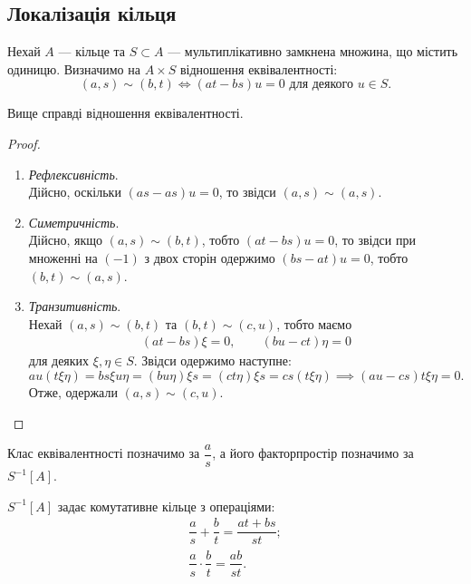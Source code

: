 \documentclass{math_library}
\begin{document}
\subsection{Локалізація кільця}
Нехай $A$ --- кільце та $S \subset A$ --- мультиплікативно замкнена множина, що містить одиницю. Визначимо на $A \times S$ відношення еквівалентності:
\[
(a,s) \sim (b,t) \iff (at - bs)u = 0 \text{ для деякого $u \in S$}.
\]

\begin{proposition}
Вище справді відношення еквівалентності.
\end{proposition}

\begin{proof}
\begin{enumerate}[topsep=0pt,wide=0pt,label={\Roman*.}]
\item \textit{Рефлексивність}.\\
Дійсно, оскільки $(as-as)u = 0$, то звідси $(a,s) \sim (a,s)$.

\item \textit{Симетричність}.\\
Дійсно, якщо $(a,s) \sim (b,t)$, тобто $(at-bs)u = 0$, то звідси при множенні на $(-1)$ з двох сторін одержимо $(bs-at)u = 0$, тобто $(b,t) \sim (a,s)$.

\item \textit{Транзитивність}.\\
Нехай $(a,s) \sim (b,t)$ та $(b,t) \sim (c,u)$, тобто маємо
\begin{align*}
(at - bs) \xi = 0, \qquad (bu - ct) \eta = 0
\end{align*}
для деяких $\xi,\eta \in S$. Звідси одержимо наступне:
\[
au (t \xi \eta) = bs \xi u \eta = (bu \eta) \xi s = (ct \eta) \xi s = cs (t \xi \eta) \implies (au - cs) t \xi \eta = 0.
\]
Отже, одержали $(a,s) \sim (c,u)$.
\end{enumerate}
\end{proof}

Клас еквівалентності позначимо за $\dfrac{a}{s}$, а його факторпростір позначимо за $S^{-1}[A]$.

\begin{proposition}
$S^{-1}[A]$ задає комутативне кільце з операціями:
\begin{align*}
\dfrac{a}{s} + \dfrac{b}{t} = \dfrac{at+bs}{st}; \\
\dfrac{a}{s} \cdot \dfrac{b}{t} = \dfrac{ab}{st}.
\end{align*}
\end{proposition}
\end{document}
